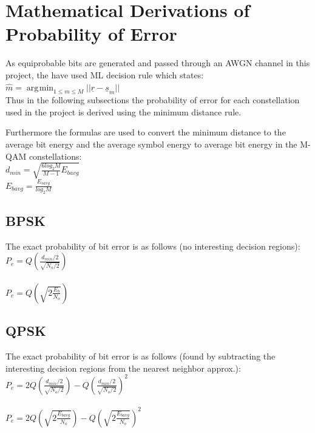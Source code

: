 \documentclass[]{article}
\DeclareMathOperator*{\argmin}{\arg\!\min}
\begin{document}
\newpage
\section{Mathematical Derivations of Probability of Error}
\label{sec:deriv}
As equiprobable bits are generated and passed through an AWGN channel in this project, the have used ML decision rule which states: \\

$\hat{m} = \argmin_{1\leq m \leq M}{||\underline{r} - \underline{s}_m||}$ 
\\

Thus in the following subsections the probability of error for each constellation used in the project is derived using the minimum distance rule.

Furthermore the formulas are used to convert the minimum distance to the average bit energy and the average symbol energy to average bit energy in the M-QAM constellations:\\

$d_{min} = \sqrt{\frac{6log_2M}{M-1}E_{bavg}} $\\

$E_{bavg} = \frac{E_{savg}}{log_2M}$



\subsection{BPSK}
\label{sec:bpsk}
The exact probability of bit error is as follows (no interesting decision regions):\\

$ P_e = Q(\frac{d_{min}/2}{\sqrt{N_o/2}}) $ \\
\\
$ P_e = Q(\sqrt{2\frac{E_b}{N_o}}) $ \\

\subsection{QPSK}
\label{sec:qpsk}

The exact probability of bit error is as follows (found by subtracting the interesting decision regions from the nearest neighbor approx.):\\

$ P_e = 2Q(\frac{d_{min}/2}{\sqrt{N_o/2}})-Q(\frac{d_{min}/2}{\sqrt{N_o/2}})^2$ \\
\\
$ P_e = 2Q(\sqrt{2\frac{E_{bavg}}{N_o}})-Q(\sqrt{2\frac{E_{bavg}}{N_o}})^2$ \\
\end{document}
